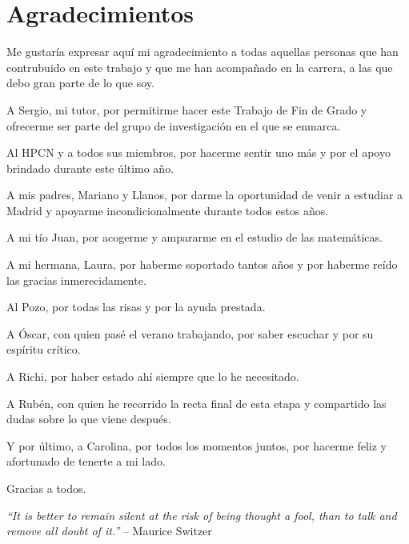 \chapter*{Agradecimientos}

Me gustaría expresar aquí mi agradecimiento a todas aquellas personas que han contrubuido en este trabajo y que me han acompañado en la carrera, a las que debo gran parte de lo que soy.

\noindent
A Sergio, mi tutor, por permitirme hacer este Trabajo de Fin de Grado y ofrecerme ser parte del grupo de investigación en el que se enmarca.

\noindent
Al HPCN y a todos sus miembros, por hacerme sentir uno más y por el apoyo brindado durante este último año.

\noindent
A mis padres, Mariano y Llanos, por darme la oportunidad de venir a estudiar a Madrid y apoyarme incondicionalmente durante todos estos años.

\noindent
A mi tío Juan, por acogerme y ampararme en el estudio de las matemáticas.

\noindent
A mi hermana, Laura, por haberme soportado tantos años y por haberme reído las gracias inmerecidamente.

\noindent
Al Pozo, por todas las risas y por la ayuda prestada.

\noindent
A Óscar, con quien pasé el verano trabajando, por saber escuchar y por su espíritu crítico.

\noindent
A Richi, por haber estado ahí siempre que lo he necesitado.

\noindent
A Rubén, con quien he recorrido la recta final de esta etapa y compartido las dudas sobre lo que viene después.

\noindent
Y por último, a Carolina, por todos los momentos juntos, por hacerme feliz y afortunado de tenerte a mi lado.

\noindent
Gracias a todos.

\begin{flushright}
\textit{``It is better to remain silent at the risk of being thought a fool, than to talk and remove all doubt of it.''}
-- Maurice Switzer
\end{flushright}
